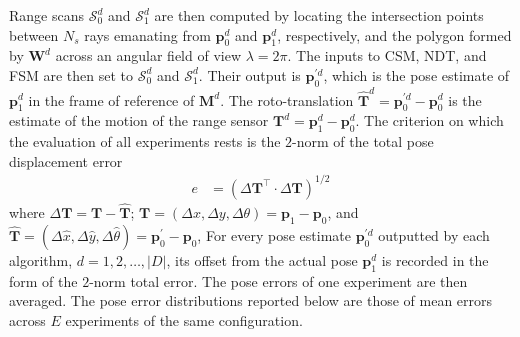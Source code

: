 Range scans $\mathcal{S}_0^d$ and $\mathcal{S}_1^d$ are then computed by
locating the intersection points between $N_s$ rays emanating from $\bm{p}_0^d$
and $\bm{p}_1^d$, respectively, and the polygon formed by $\bm{W}^d$ across an
angular field of view $\lambda = 2\pi$. The inputs to CSM, NDT, and FSM are
then set to $\mathcal{S}_0^d$ and $\mathcal{S}_1^d$. Their output is
$\bm{p}_0^{\prime d}$, which is the pose estimate of $\bm{p}_1^d$ in the frame
of reference of $\bm{M}^d$. The roto-translation
$\hat{\bm{T}}^d = \bm{p}_0^{\prime d}-\bm{p}_0^d$ is the estimate of the motion
of the range sensor $\bm{T}^d = \bm{p}_1^d - \bm{p}_0^d$. The criterion on
which the evaluation of all experiments rests is the $2$-norm of the total pose
displacement error
\begin{align}
  e &= (\Delta \bm{T}^\top \cdot \Delta \bm{T})^{1/2}
  \label{eq:rototranslation_error}
\end{align}
where $\Delta \bm{T} = \bm{T} - \hat{\bm{T}}$;
$\bm{T} = (\Delta x, \Delta y, \Delta \theta) = \bm{p}_1 - \bm{p}_0$, and
$\hat{\bm{T}} = (\Delta \hat{x}, \Delta \hat{y}, \Delta \hat{\theta}) = \bm{p}_0^\prime - \bm{p}_0$,
For every pose estimate $\bm{p}_0^{\prime d}$ outputted by
each algorithm, $d = 1,2,\dots,|D|$, its offset from the actual pose
$\bm{p}_1^d$ is recorded in the form of the $2$-norm total error. The pose
errors of one experiment are then averaged. The pose error distributions
reported below are those of mean errors across $E$ experiments of the same
configuration.

